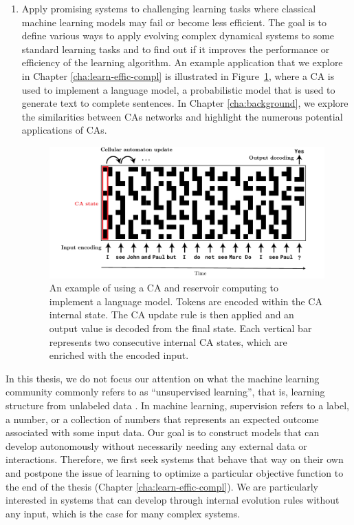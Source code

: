 \begin{enumerate}
  \item Apply promising systems to challenging learning tasks where classical
        machine learning models may fail or become less efficient. The goal is to
        define various ways to apply evolving complex dynamical systems to some
        standard learning tasks and to find out if it improves the performance
        or efficiency of the learning algorithm. An example application that we
        explore in Chapter \ref{cha:learn-effic-compl} is illustrated in
        Figure~\ref{fig:ca_lm}, where a \ac{CA} is used to implement a language
        model, a probabilistic model that is used to generate text to complete
        sentences. In Chapter \ref{cha:background}, we explore the similarities
        between \acp{CA} networks and highlight the numerous potential applications of \acp{CA}.
\begin{figure}[htbp]
  \centering
  \includegraphics[width=\linewidth]{figures/ca_lm}
  \caption{An example of using a \acl{CA} and reservoir computing to implement a
    language model. Tokens are encoded within the \acl{CA} internal state. The
    \acl{CA} update rule is then applied and an output value is decoded from the
    final state. Each vertical bar represents two consecutive internal \ac{CA} states, which 
    are enriched with the encoded input.}
  \label{fig:ca_lm}
\end{figure}

\end{enumerate}

In this thesis, we do not focus our attention on what the machine learning
community commonly refers to as ``unsupervised learning'', that is, learning
structure from unlabeled data
\parencite{hintonUnsupervisedLearningFoundations1999}. In machine learning,
supervision refers to a label, a number, or a collection of numbers that
represents an expected outcome associated with some input data. Our goal is to
construct models that can develop autonomously without necessarily needing any external data or
interactions. Therefore, we first seek systems that behave that way on their
own and postpone the issue of learning to optimize a particular objective
function to the end of the thesis (Chapter \ref{cha:learn-effic-compl}). 
We are particularly interested in systems that can develop through
internal evolution rules without any input, which is the case for many complex
systems.

